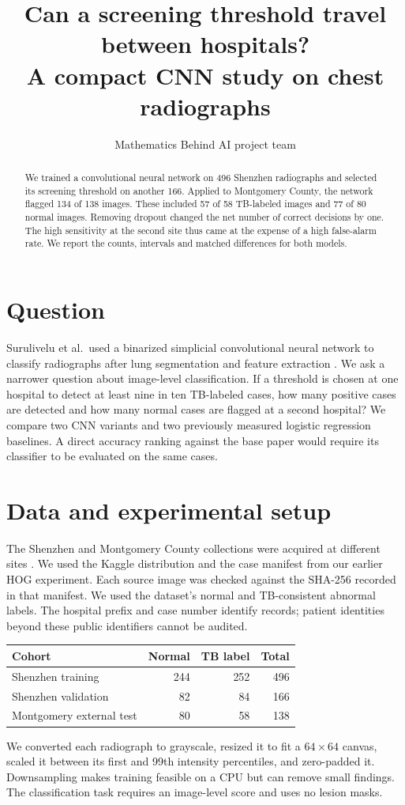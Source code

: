 \documentclass[11pt]{article}
\title{Can a screening threshold travel between hospitals?\\A compact CNN study on chest radiographs}
\author{Mathematics Behind AI project team}
\date{}
\begin{document}
\maketitle
\begin{abstract}
We trained a convolutional neural network on 496 Shenzhen radiographs and selected its screening threshold on another 166. Applied to Montgomery County, the network flagged 134 of 138 images. These included 57 of 58 TB-labeled images and 77 of 80 normal images. Removing dropout changed the net number of correct decisions by one. The high sensitivity at the second site thus came at the expense of a high false-alarm rate. We report the counts, intervals and matched differences for both models.
\end{abstract}

\section{Question}
Surulivelu et al.\ used a binarized simplicial convolutional neural network to classify radiographs after lung segmentation and feature extraction \cite{base}. We ask a narrower question about image-level classification. If a threshold is chosen at one hospital to detect at least nine in ten TB-labeled cases, how many positive cases are detected and how many normal cases are flagged at a second hospital? We compare two CNN variants and two previously measured logistic regression baselines. A direct accuracy ranking against the base paper would require its classifier to be evaluated on the same cases.

\section{Data and experimental setup}
The Shenzhen and Montgomery County collections were acquired at different sites \cite{jaeger}. We used the Kaggle distribution \cite{kaggle} and the case manifest from our earlier HOG experiment. Each source image was checked against the SHA-256 recorded in that manifest. We used the dataset's normal and TB-consistent abnormal labels. The hospital prefix and case number identify records; patient identities beyond these public identifiers cannot be audited.
\begin{center}
\begin{tabular}{lrrr}
\toprule Cohort & Normal & TB label & Total\\\midrule
Shenzhen training & 244 & 252 & 496\\
Shenzhen validation & 82 & 84 & 166\\
Montgomery external test & 80 & 58 & 138\\\bottomrule
\end{tabular}
\end{center}
We converted each radiograph to grayscale, resized it to fit a $64\times64$ canvas, scaled it between its first and 99th intensity percentiles, and zero-padded it. Downsampling makes training feasible on a CPU but can remove small findings. The classification task requires an image-level score and uses no lesion masks.
\end{document}
